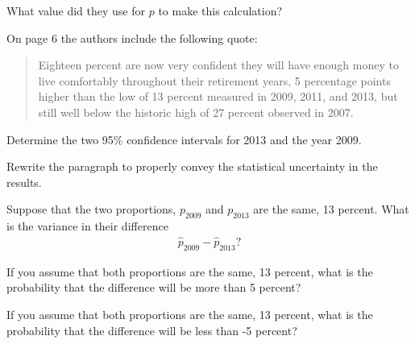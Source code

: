 \begin{problem}
\begin{subproblem}
    \vfill

  \item What value did they use for $p$ to make this calculation?

    \vfill

    \clearpage

  \item On page 6 the authors include the following quote:
    \begin{quote}
      Eighteen percent are now very confident they will have enough
      money to live comfortably throughout their retirement years, 5
      percentage points higher than the low of 13 percent measured in
      2009, 2011, and 2013, but still well below the historic high of
      27 percent observed in 2007.
    \end{quote}

    \begin{subproblem}
    \item Determine the two 95\% confidence intervals for 2013 and the
      year 2009.

      \vfill

    \item Rewrite the paragraph to properly convey the statistical
      uncertainty in the results.

      \vfill

      \clearpage

    \item Suppose that the two proportions, $p_{2009}$ and
      $p_{2013}$ are the same, 13 percent. What is the variance in their
      difference
      \begin{eqnarray*}
        \hat{p}_{2009} - \hat{p}_{2013}?
      \end{eqnarray*}

      \vfill

    \item If you assume that both  proportions are the same, 13
      percent, what is the probability that the difference will be
      more than 5 percent?

      \vfill

    \item If you assume that both  proportions are the same, 13
      percent, what is the probability that the difference will be
      less than -5 percent?

      \vfill

    \end{subproblem}
  \end{subproblem}

\end{problem}
